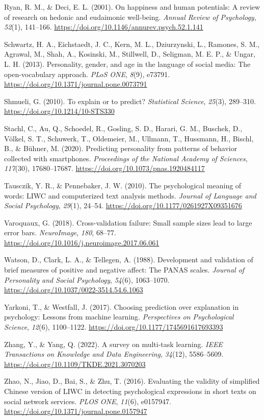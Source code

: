 \documentclass[11pt,letterpaper]{article}
\newcommand{\APAref}{\par\noindent\hangindent=0.5in\hangafter=1\relax}
\begin{document}
\APAref Ryan, R. M., \& Deci, E. L. (2001). On happiness and human potentials: A review of research on hedonic and eudaimonic well-being. \emph{Annual Review of Psychology}, \emph{52}(1), 141--166. \url{https://doi.org/10.1146/annurev.psych.52.1.141}

\APAref Schwartz, H. A., Eichstaedt, J. C., Kern, M. L., Dziurzynski, L., Ramones, S. M., Agrawal, M., Shah, A., Kosinski, M., Stillwell, D., Seligman, M. E. P., \& Ungar, L. H. (2013). Personality, gender, and age in the language of social media: The open-vocabulary approach. \emph{PLoS ONE}, \emph{8}(9), e73791. \url{https://doi.org/10.1371/journal.pone.0073791}

\APAref Shmueli, G. (2010). To explain or to predict? \emph{Statistical Science}, \emph{25}(3), 289--310. \url{https://doi.org/10.1214/10-STS330}

\APAref Stachl, C., Au, Q., Schoedel, R., Gosling, S. D., Harari, G. M., Buschek, D., Völkel, S. T., Schuwerk, T., Oldemeier, M., Ullmann, T., Hussmann, H., Bischl, B., \& Bühner, M. (2020). Predicting personality from patterns of behavior collected with smartphones. \emph{Proceedings of the National Academy of Sciences}, \emph{117}(30), 17680--17687. \url{https://doi.org/10.1073/pnas.1920484117}

\APAref Tausczik, Y. R., \& Pennebaker, J. W. (2010). The psychological meaning of words: LIWC and computerized text analysis methods. \emph{Journal of Language and Social Psychology}, \emph{29}(1), 24--54. \url{https://doi.org/10.1177/0261927X09351676}

\APAref Varoquaux, G. (2018). Cross-validation failure: Small sample sizes lead to large error bars. \emph{NeuroImage}, \emph{180}, 68--77. \url{https://doi.org/10.1016/j.neuroimage.2017.06.061}

\APAref Watson, D., Clark, L. A., \& Tellegen, A. (1988). Development and validation of brief measures of positive and negative affect: The PANAS scales. \emph{Journal of Personality and Social Psychology}, \emph{54}(6), 1063--1070. \url{https://doi.org/10.1037/0022-3514.54.6.1063}

\APAref Yarkoni, T., \& Westfall, J. (2017). Choosing prediction over explanation in psychology: Lessons from machine learning. \emph{Perspectives on Psychological Science}, \emph{12}(6), 1100--1122. \url{https://doi.org/10.1177/1745691617693393}

\APAref Zhang, Y., \& Yang, Q. (2022). A survey on multi-task learning. \emph{IEEE Transactions on Knowledge and Data Engineering}, \emph{34}(12), 5586--5609. \url{https://doi.org/10.1109/TKDE.2021.3070203}

\APAref Zhao, N., Jiao, D., Bai, S., \& Zhu, T. (2016). Evaluating the validity of simplified Chinese version of LIWC in detecting psychological expressions in short texts on social network services. \emph{PLOS ONE}, \emph{11}(6), e0157947. \url{https://doi.org/10.1371/journal.pone.0157947}
\end{document}
